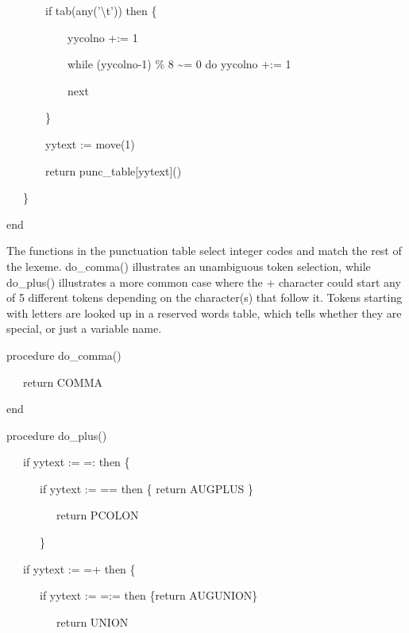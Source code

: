 {\ttfamily\mdseries
\ \ \ \ \ \ \ if tab(any('{\textbackslash}t')) then \{}

{\ttfamily\mdseries
\ \ \ \ \ \ \ \ \ \ \ yycolno +:= 1}

{\ttfamily\mdseries
\ \ \ \ \ \ \ \ \ \ \ while (yycolno-1) \% 8 \~{}= 0 do yycolno +:= 1}

{\ttfamily\mdseries
\ \ \ \ \ \ \ \ \ \ \ next}

{\ttfamily\mdseries
\ \ \ \ \ \ \ \}}


\bigskip

{\ttfamily\mdseries
\ \ \ \ \ \ \ yytext := move(1)}

{\ttfamily\mdseries
\ \ \ \ \ \ \ return punc\_table[yytext]()}

{\ttfamily\mdseries
\ \ \ \}}

{\ttfamily\mdseries
end}


The functions in the punctuation table select integer codes and match
the rest of the lexeme. do\_comma() illustrates an unambiguous token
selection, while do\_plus() illustrates a more common case where the
{\textquotedbl}+{\textquotedbl} character could start any of 5
different tokens depending on the character(s) that follow it. Tokens
starting with {\textquotedbl}letters{\textquotedbl} are looked up in a
reserved words table, which tells whether they are special, or just a
variable name.

{\ttfamily\mdseries
procedure do\_comma()}

{\ttfamily\mdseries
\ \ \ return COMMA}

{\ttfamily\mdseries
end}


\bigskip

{\ttfamily\mdseries
procedure do\_plus()}

{\ttfamily\mdseries
\ \ \ if yytext {\textbar}{\textbar}:= ={\textquotedbl}:{\textquotedbl} then \{}

{\ttfamily\mdseries
\ \ \ \ \ \ if yytext {\textbar}{\textbar}:= ={\textquotedbl}={\textquotedbl} then \{ return AUGPLUS \}}

{\ttfamily\mdseries
\ \ \ \ \ \ \ \ \ return PCOLON}

{\ttfamily\mdseries
\ \ \ \ \ \ \}}

{\ttfamily\mdseries
\ \ \ if yytext {\textbar}{\textbar}:= ={\textquotedbl}+{\textquotedbl} then \{}

{\ttfamily\mdseries
\ \ \ \ \ \ if yytext {\textbar}{\textbar}:= ={\textquotedbl}:={\textquotedbl} then \{return AUGUNION\}}

{\ttfamily\mdseries
\ \ \ \ \ \ \ \ \ return UNION}


